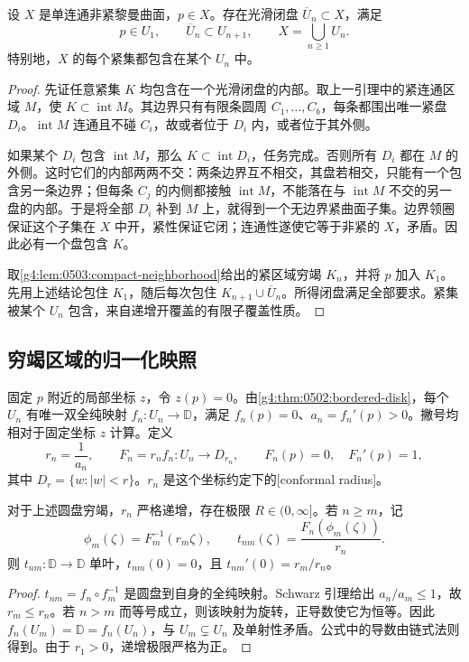 \begin{theorem}
	\label{g4:thm:0503:disk-exhaustion}
	设 \(X\) 是单连通非紧黎曼曲面，\(p\in X\)。存在光滑闭盘 \(\overline U_n\subset X\)，满足
	\[
		p\in U_1,\qquad \overline U_n\subset U_{n+1},\qquad
		X=\bigcup_{n\ge1}U_n.
	\]
	特别地，\(X\) 的每个紧集都包含在某个 \(U_n\) 中。
\end{theorem}
\begin{proof}
	先证任意紧集 \(K\) 均包含在一个光滑闭盘的内部。取上一引理中的紧连通区域 \(M\)，使 \(K\subset\operatorname{int}M\)。其边界只有有限条圆周 \(C_1,\ldots,C_b\)，每条都围出唯一紧盘 \(D_i\)。\(\operatorname{int}M\) 连通且不碰 \(C_i\)，故或者位于 \(D_i\) 内，或者位于其外侧。

	如果某个 \(D_i\) 包含 \(\operatorname{int}M\)，那么 \(K\subset\operatorname{int}D_i\)，任务完成。否则所有 \(D_i\) 都在 \(M\) 的外侧。这时它们的内部两两不交：两条边界互不相交，其盘若相交，只能有一个包含另一条边界；但每条 \(C_j\) 的内侧都接触 \(\operatorname{int}M\)，不能落在与 \(\operatorname{int}M\) 不交的另一盘的内部。于是将全部 \(D_i\) 补到 \(M\) 上，就得到一个无边界紧曲面子集。边界领圈保证这个子集在 \(X\) 中开，紧性保证它闭；连通性遂使它等于非紧的 \(X\)，矛盾。因此必有一个盘包含 \(K\)。

	取\cref{g4:lem:0503:compact-neighborhood}给出的紧区域穷竭 \(K_n\)，并将 \(p\) 加入 \(K_1\)。先用上述结论包住 \(K_1\)，随后每次包住 \(K_{n+1}\cup\overline U_n\)。所得闭盘满足全部要求。紧集被某个 \(U_n\) 包含，来自递增开覆盖的有限子覆盖性质。
\end{proof}

\subsection{穷竭区域的归一化映照}
\label{g4:subsec:0503:02}

固定 \(p\) 附近的局部坐标 \(z\)，令 \(z(p)=0\)。由\cref{g4:thm:0502:bordered-disk}，每个 \(U_n\) 有唯一双全纯映射 \(f_n:U_n\to\mathbb D\)，满足 \(f_n(p)=0\)、\(a_n=f_n'(p)>0\)。撇号均相对于固定坐标 \(z\) 计算。定义
\[
	r_n=\frac1{a_n},\qquad F_n=r_nf_n:U_n\longrightarrow D_{r_n},
	\qquad F_n(p)=0,\quad F_n'(p)=1,
\]
其中 \(D_r=\{w:|w|<r\}\)。\(r_n\) 是这个坐标约定下的[conformal radius]。

\begin{proposition}
	\label{g4:prop:0503:radii}
	对于上述圆盘穷竭，\(r_n\) 严格递增，存在极限 \(R\in(0,\infty]\)。若 \(n\ge m\)，记
	\[
		\phi_m(\zeta)=F_m^{-1}(r_m\zeta),\qquad
		t_{nm}(\zeta)=\frac{F_n(\phi_m(\zeta))}{r_n}.
	\]
	则 \(t_{nm}:\mathbb D\to\mathbb D\) 单叶，\(t_{nm}(0)=0\)，且 \(t_{nm}'(0)=r_m/r_n\)。
\end{proposition}
\begin{proof}
	\(t_{nm}=f_n\circ f_m^{-1}\) 是圆盘到自身的全纯映射。Schwarz 引理给出 \(a_n/a_m\le1\)，故 \(r_m\le r_n\)。若 \(n>m\) 而等号成立，则该映射为旋转，正导数使它为恒等。因此 \(f_n(U_m)=\mathbb D=f_n(U_n)\)，与 \(U_m\subsetneq U_n\) 及单射性矛盾。公式中的导数由链式法则得到。由于 \(r_1>0\)，递增极限严格为正。
\end{proof}

